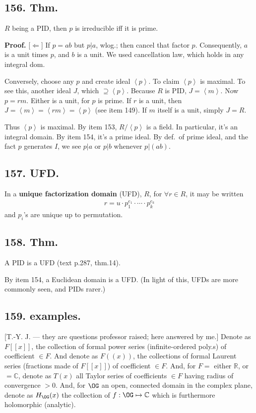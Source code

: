 \documentclass[12pt]{article}
\newcommand\M\cdot%
\newcommand\Ev\forall%
\newcommand\Mp\mapsto%
\newcommand{\Ip}{\Rightarrow} %
\newcommand{\Ab}[1]{ \left\langle #1 \right\rangle } %
\newcommand{\BF}[1]{ \mathbb{#1} }%
\newcommand{\Ss}[1]{\textsf{\bfseries{#1}}}%
\newcommand{\EqGo}[1]{ \begin{gather*}{#1}\end{gather*} } %
\begin{document}
\subsection*{156. Thm.} \(R\) being a PID, then \(p\) is irreducible iff it is prime. \par
\Ss{Proof.} [\(\Leftarrow\)] If \(p=ab\) but \(p \Big| a\), wlog.; then cancel that factor \(p\). 
Consequently, \(a\) is a unit times \(p\), and \(b\) is a unit. 
We used cancellation law, which holds in any integral dom. \par
[\(\Ip\)] Conversely, choose any \(p\) and create ideal \(\Ab{p}\). To claim \(\Ab{p}\) is maximal. 
To see this, another ideal \(J\), which \(\supseteq \Ab{p}\). 
Because \(R\) is PID, \(J =\Ab{m}\). 
Now \(p= rm\). Either is a unit, for \(p\) is prime. 
If \(r\) is a unit, then \(J= \Ab{m} = \Ab{rm} = \Ab{p}\) (see item 149). 
If \(m\) itself is a unit, simply \(J=R\). \par
Thus \(\Ab{p}\) is maximal. 
By item 153, \(R/\Ab{p}\) is a field. 
In particular, it's an integral domain. 
By item 154, it's a prime ideal. 
By def.\ of prime ideal, and the fact \(p\) generates \(I\), we see \(p|a\) or \(p|b\) whenever \(p|(ab)\). 

\subsection*{157. UFD.} In a \Ss{unique factorization domain} (UFD), \(R\), for \(\Ev r \in R\), it may be written \EqGo{
 r= u \M p_1^{e_1} \M \dotsb \M p_k^{e_k}
} and \(p_i\)'s are unique up to permutation. 

\subsection*{158. Thm.} A PID is a UFD (text p.287, thm.14). \par
By item 154, a Euclidean domain is a UFD. 
(In light of this, UFDs are more commonly seen, and PIDs rarer.)

\subsection*{159. examples.} [T.-Y. J. --- they are questions professor raised; here answered by me.] Denote as \(F[[x]]\), the collection of formal power series (infinite-ordered poly.s) of coefficient \(\in F\). 
And denote as \(F((x))\), the collections of formal Laurent series (fractions made of \(F[[x]]\))  of coefficient \(\in F\). 
And, for \(F=\) either \(\BF{R}\), or \(= \BF{C}\), denote as \(T(x)\) all Taylor series of coefficients \(\in F\) having radius of convergence \(>0\). 
And, for \(\OG\) an open, connected domain in the complex plane, denote as \(H_\OG(x)\) the collection of \(f: \OG \Mp \BF{C}\) which is furthermore holomorphic (analytic). 
\end{document}
